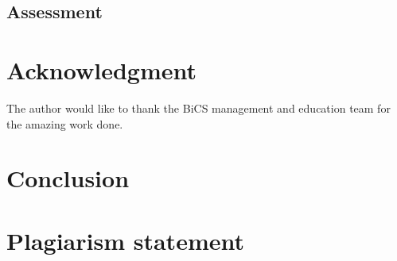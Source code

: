 \documentclass[conference,compsoc]{IEEEtran}
\begin{document}
\subsection{Assessment}


\section*{Acknowledgment}
The author would like to thank the BiCS management and education team for the amazing work done.


\section{Conclusion}


\newpage


\section{Plagiarism statement}
\end{document}
